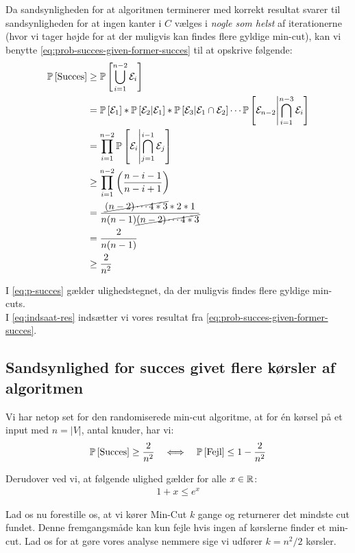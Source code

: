 Da sandsynligheden for at algoritmen terminerer med korrekt resultat svarer til sandsynligheden for at ingen kanter i $C$ vælges i \emph{nogle som helst} af iterationerne (hvor vi tager højde for at der muligvis kan findes flere gyldige min-cut), kan vi benytte \cref{eq:prob-succes-given-former-succes} til at opskrive følgende:
\begin{align}
  \P{\text{Succes}} &\geq \P{ \bigcup_{i=1}^{n-2}   \event_i} \label{eq:p-succes} \\
  &= \P{\event_1} * \P{\event_2 | \event_1} * \P{\event_3 | \event_1 \cap \event_2} \cdots \P{ \event_{n-2} \middle| \bigcap_{i=1}^{n-3} \event_i } \nonumber \\
  &= \prod_{i=1}^{n-2} \P{ \event_i \middle| \bigcap_{j=1}^{i-1} \event_j } \nonumber \\
  &\geq \prod_{i=1}^{n-2} \p{ \frac{n-i-1}{n-i+1} } \label{eq:indsaat-res} \\
  &= \frac{\cancel{(n-2) \cdots 4*3}*2*1 }{n(n-1)\cancel{(n-2) \cdots 4*3} } \nonumber \\
  &= \frac{2}{n(n-1)} \nonumber \\
  &\geq \frac{2}{n^2} \nonumber
\end{align}

I \cref{eq:p-succes} gælder ulighedstegnet, da der muligvis findes flere gyldige min-cuts.\\
I \cref{eq:indsaat-res} indsætter vi vores resultat fra \cref{eq:prob-succes-given-former-succes}.



\subsection{Sandsynlighed for succes givet flere kørsler af algoritmen}
Vi har netop set for den randomiserede min-cut algoritme, at for én kørsel på et input med $n = |V|$, antal knuder, har vi:
$$
  \P{\text{Succes}} \geq \frac{2}{n^2} \quad \Longleftrightarrow \quad \P{\text{Fejl}} \leq 1 - \frac{2}{n^2}
$$

Derudover ved vi, at følgende ulighed gælder for alle $x \in \R$:
\begin{align} \label{eq:exp-regel}
  1 + x \leq e^x
\end{align}

Lad os nu forestille os, at vi kører Min-Cut $k$ gange og returnerer det mindste cut fundet. Denne fremgangsmåde kan kun fejle hvis ingen af kørslerne finder et min-cut. Lad os for at gøre vores analyse nemmere sige vi udfører $k = n^2/2$ kørsler.

